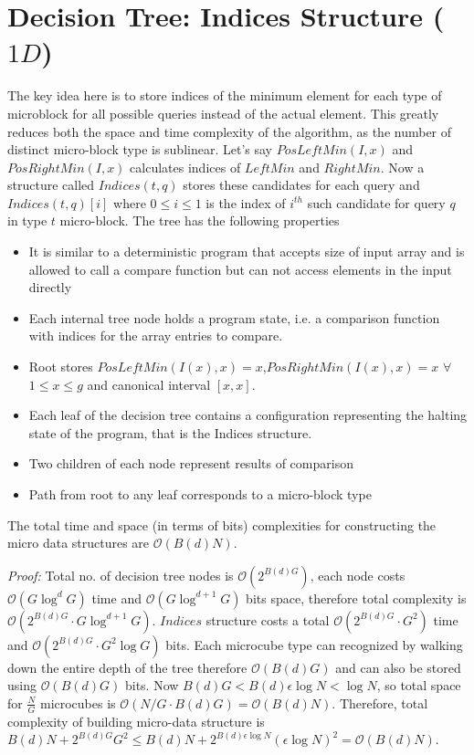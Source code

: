 \section{Decision Tree: Indices Structure ($1D$)}
The key idea here is to store indices of the minimum element for each type of microblock for all possible queries instead of the actual element. This greatly reduces both the space and time complexity of the algorithm, as the number of distinct micro-block type is sublinear. Let's say $PosLeftMin(I,x)$ and $PosRightMin(I,x)$ calculates indices of $LeftMin$ and $RightMin$. Now a structure called $Indices(t,q)$ stores these candidates for each query and $Indices(t,q)[i]$ where $0\leq i\leq1$ is the index of $i^{th}$ such candidate for query $q$ in type $t$ micro-block. The tree has the following properties
\compress
\begin{itemize} \itemsep1pt \parskip0pt 
\item It is similar to a deterministic program that accepts size of input array and is allowed to call a compare function but can not access elements in the input directly
\item Each internal tree node holds a program state, i.e. a comparison function with indices for the array entries to compare.
\item Root stores $PosLeftMin(I(x),x) = x$,$PosRightMin(I(x),x) = x$ $\forall$ $1\leq x\leq g$ and canonical interval $[x,x]$.
\item Each leaf of the decision tree contains a configuration representing the halting state of the program, that is the Indices structure.
\item Two children of each node represent results of comparison
\item Path from root to any leaf corresponds to a micro-block type
\end{itemize}
\begin{lemma}
The total time and space (in terms of bits) complexities for constructing the micro data structures are $\mathcal{O}(B(d)N)$.
\end{lemma}
\emph{Proof:} Total no. of decision tree nodes is $\mathcal{O}(2^{B(d)G})$, each node costs $\mathcal{O}(G\log^dG)$ time and $\mathcal{O}(G\log^{d+1}G)$ bits space, therefore total complexity is $\mathcal{O}(2^{B(d)G}\cdot G\log^{d+1}G)$. $Indices$ structure costs a total $\mathcal{O}(2^{B(d)G}\cdot G^2)$ time and $\mathcal{O}(2^{B(d)G}\cdot G^2\log G)$ bits. Each microcube type can recognized by walking down the entire depth of the tree therefore $\mathcal{O}(B(d)G)$ and can also be stored using $\mathcal{O}(B(d)G)$ bits. Now $B(d)G<B(d)\epsilon\log N<\log N$, so total space for $\frac{N}{G}$ microcubes is $\mathcal{O}(N/G\cdot B(d)G)=\mathcal{O}(B(d)N)$. Therefore, total complexity of building micro-data structure is $B(d)N+2^{B(d)G}G^2 \leq B(d)N+2^{B(d)\epsilon\log N}(\epsilon\log N)^2 = \mathcal{O}(B(d)N)$.


